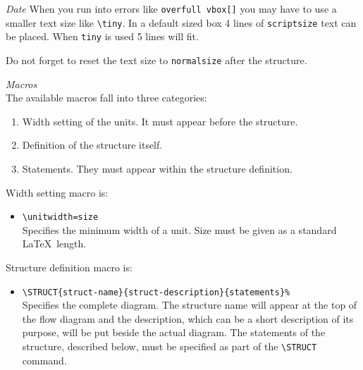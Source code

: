 \begin{namelist}{{\large\it Date}}
When you run into errors like {\tt overfull vbox[]} you may have
to use a smaller text size like \verb+\tiny+.
In a default sized box 4 lines of {\tt scriptsize} text can be
placed. When {\tt tiny} is used 5 lines will fit.

Do not forget to
reset the text size to \verb+normalsize+ after the structure.

\item[{\large\it Macros}]\mbox{}\\
The available macros fall into three categories:
\begin{enumerate}
\item Width setting of the units. It must appear before the structure.
\item Definition of the structure itself.
\item Statements. They must appear within the structure
definition.
\end{enumerate}

Width setting macro is:
\begin{itemize}
\item \verb+\unitwidth=size+\\ Specifies
the minimum width of a unit. Size must be given as a standard
\LaTeX\  length.
\end{itemize}

Structure definition macro is:
\begin{itemize}
\item \verb+\STRUCT{struct-name}{struct-description}{statements}%+\\
Specifies the complete diagram. The structure name will appear at
the top of the flow diagram and the description, which can be a
short description of its purpose, will be put beside the actual
diagram. The statements of the structure, described below, must
be specified as part of the \verb+\STRUCT+ command.
\end{itemize}


\end{namelist}
